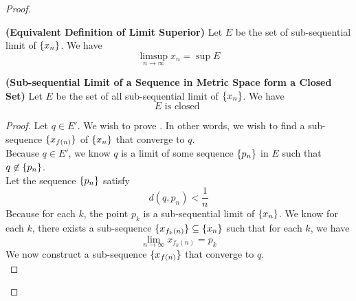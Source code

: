 \documentclass{report}
\begin{document}
\begin{proof}
\begin{corollary}
\label{2.3.9}
\textbf{(Equivalent Definition of Limit Superior)} Let $E$ be the set of sub-sequential limit of  $\{ x_n \}$. We have
\begin{equation}
\limsup_{n\to\infty} x_n=\sup E
\end{equation}
\end{corollary}
\begin{theorem}
\label{2.3.10}
\textbf{(Sub-sequential Limit of a Sequence in Metric Space form a Closed Set)} Let $E$ be the set of all sub-sequential limit of $\{ x_n \}$. We have
\begin{equation}
E\text{ is closed }
\end{equation}
\end{theorem}
\begin{proof}
Let $q\in E'$. We wish to prove . In other words, we wish to find a sub-sequence $\{ x_{f(n)} \}$ of $\{ x_n \}$ that converge to $q$.\\

Because $q\in E'$, we know $q$ is a limit of some sequence  $\{ p_n \}$ in $E$ such that $q\not\in \{ p_n \}$.\\

Let the sequence $\{ p_n \}$ satisfy 
\begin{equation}
d(q,p_n)<\frac{1}{n}
\end{equation}
Because for each $k$, the point $p_k$ is a sub-sequential limit of $\{ x_n \}$. We know for each $k$, there exists a sub-sequence $\{ x_{f_k(n)} \}\subseteq \{ x_n \}$ such that for each $k$, we have
\begin{equation}
\lim_{n\to\infty}x_{f_k(n)}= p_k
\end{equation}
We now construct a sub-sequence $\{ x_{f(n)} \}$ that converge to $q$.\\


\end{proof}
\end{proof}
\end{document}

